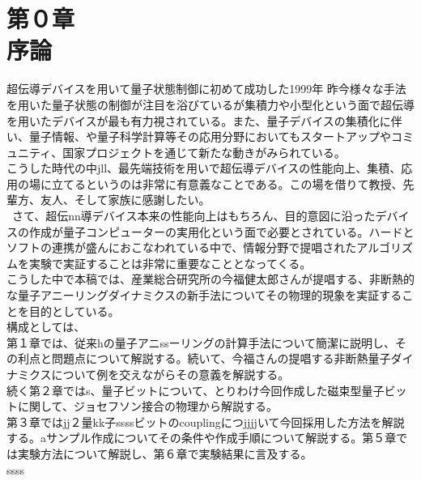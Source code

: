 \chapter{第０章\\序論}
超伝導デバイスを用いて量子状態制御に初めて成功した1999年
昨今様々な手法を用いた量子状態の制御が注目を浴びているが集積力や小型化という面で超伝導を用いたデバイスが最も有力視されている。また、量子デバイスの集積化に伴い、量子情報、や量子科学計算等その応用分野においてもスタートアップやコミュニティ、国家プロジェクトを通じて新たな動きがみられている。\\
こうした時代の中jll、最先端技術を用いで超伝導デバイスの性能向上、集積、応用の場に立てるというのは非常に有意義なことである。この場を借りて教授、先輩方、友人、そして家族に感謝したい。\\
\ さて、超伝nn導デバイス本来の性能向上はもちろん、目的意図に沿ったデバイスの作成が量子コンピューターの実用化という面で必要とされている。ハードとソフトの連携が盛んにおこなわれている中で、情報分野で提唱されたアルゴリズムを実験で実証することは非常に重要なこととなってくる。\\
こうした中で本稿では、産業総合研究所の今福健太郎さんが提唱する、非断熱的な量子アニーリングダイナミクスの新手法についてその物理的現象を実証することを目的としている。\\
構成としては、\\
第１章では、従来hの量子アニssーリングの計算手法について簡潔に説明し、その利点と問題点について解説する。続いて、今福さんの提唱する非断熱量子ダイナミクスについて例を交えながらその意義を解説する。\\
続く第２章ではs、量子ビットについて、とりわけ今回作成した磁束型量子ビットに関して、ジョセフソン接合の物理から解説する。\\
第３章ではjj２量kk子ssssビットのcouplingにつjjjjいて今回採用した方法を解説する。aサンプル作成についてその条件や作成手順について解説する。第５章では実験方法について解説し、第６章で実験結果に言及する。\\
ssss\\